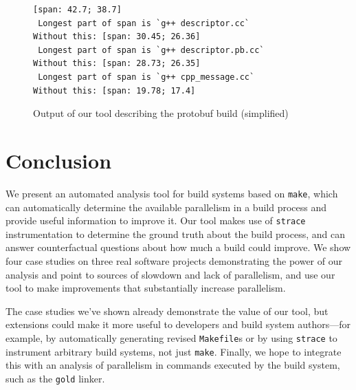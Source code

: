 \documentclass[sigconf,10pt,authorversion]{acmart}\settopmatter{printfolios=true,printccs=false,printacmref=false}
\begin{document}
\begin{figure}[t]
\begin{Verbatim}[fontsize=\small]
[span: 42.7; 38.7]
 Longest part of span is `g++ descriptor.cc`
Without this: [span: 30.45; 26.36]
 Longest part of span is `g++ descriptor.pb.cc`
Without this: [span: 28.73; 26.35]
 Longest part of span is `g++ cpp_message.cc`
Without this: [span: 19.78; 17.4]
\end{Verbatim}
\caption{Output of our tool describing the protobuf build (simplified)}
\label{code:g++1}
\end{figure}



\section{Conclusion}

We present an automated analysis tool for build systems based on
\verb|make|, which can automatically determine the available
parallelism in a build process and provide useful information to
improve it. Our tool makes use of \verb|strace| instrumentation to
determine the ground truth about the build process, and can answer
counterfactual questions about how much a build could improve.
%
We show four case studies on three real software projects
demonstrating the power of our analysis and point to sources of
slowdown and lack of parallelism, and use our tool to make
improvements that substantially increase parallelism.

The case studies we've shown already demonstrate the value of our
tool, but extensions could make it more useful to developers and build
system authors---for example, by automatically generating revised
\verb|Makefile|s or by using \verb|strace| to instrument arbitrary
build systems, not just \verb|make|. Finally, we hope to integrate
this with an analysis of parallelism in commands executed by the build
system, such as the \verb|gold| linker.

 

\balance
\end{document}
